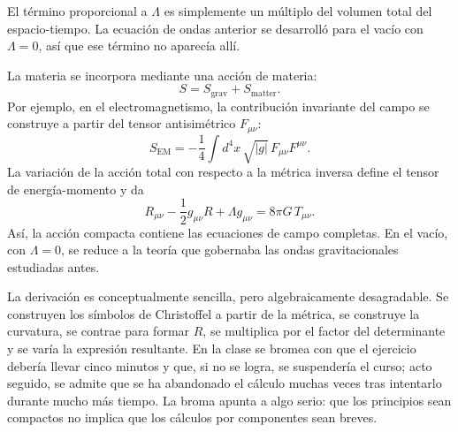 El término proporcional a \(\Lambda\) es simplemente un múltiplo del volumen total del espacio-tiempo. La ecuación de ondas anterior se desarrolló para el vacío con \(\Lambda=0\), así que ese término no aparecía allí.

La materia se incorpora mediante una acción de materia:
\begin{equation}
 S=S_{\mathrm{grav}}+S_{\mathrm{matter}}.
\end{equation}
Por ejemplo, en el electromagnetismo, la contribución invariante del campo se construye a partir del tensor antisimétrico \(F_{\mu\nu}\):
\begin{equation}
 S_{\mathrm{EM}}
 =-\frac14
 \int d^4x\,\sqrt{|g|}\,
 F_{\mu\nu}F^{\mu\nu}.
\end{equation}
La variación de la acción total con respecto a la métrica inversa define el tensor de energía-momento y da
\begin{equation}
 R_{\mu\nu}
 -\frac12 g_{\mu\nu}R
 +\Lambda g_{\mu\nu}
 =8\pi G\,T_{\mu\nu}.
 \label{eq:einstein-from-action}
\end{equation}
Así, la acción compacta contiene las ecuaciones de campo completas. En el vacío, con \(\Lambda=0\), se reduce a la teoría que gobernaba las ondas gravitacionales estudiadas antes.

\begin{classroomqa}
\end{classroomqa}

La derivación es conceptualmente sencilla, pero algebraicamente desagradable. Se construyen los símbolos de Christoffel a partir de la métrica, se construye la curvatura, se contrae para formar \(R\), se multiplica por el factor del determinante y se varía la expresión resultante. En la clase se bromea con que el ejercicio debería llevar cinco minutos y que, si no se logra, se suspendería el curso; acto seguido, se admite que se ha abandonado el cálculo muchas veces tras intentarlo durante mucho más tiempo. La broma apunta a algo serio: que los principios sean compactos no implica que los cálculos por componentes sean breves.

